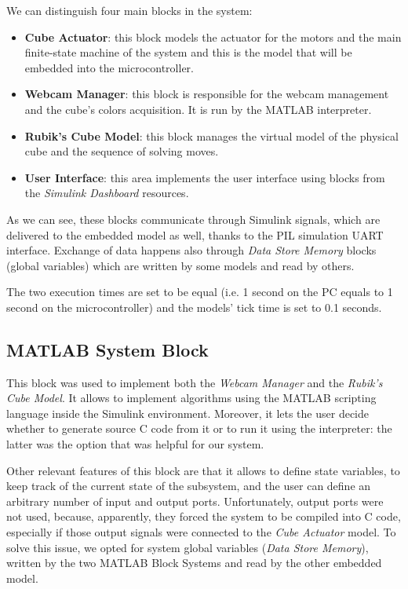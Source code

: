 \documentclass{report}
\begin{document}
We can distinguish four main blocks in the system:
\begin{itemize}
    \item \textbf{Cube Actuator}: this block models the actuator for the motors and the main finite-state machine of the system and this is the model that will be embedded into the microcontroller.
    \item \textbf{Webcam Manager}: this block is responsible for the webcam management and the cube's colors acquisition. It is run by the MATLAB interpreter.
    \item \textbf{Rubik's Cube Model}: this block manages the virtual model of the physical cube and the sequence of solving moves.
    \item \textbf{User Interface}: this area implements the user interface using blocks from the \textit{Simulink Dashboard} resources.
\end{itemize}

As we can see, these blocks communicate through Simulink signals, which are delivered to the embedded model as well, thanks to the PIL simulation UART interface. Exchange of data happens also through \textit{Data Store Memory} blocks (global variables) which are written by some models and read by others.

The two execution times are set to be equal (i.e. 1 second on the PC equals to 1 second on the microcontroller) and the models' tick time is set to 0.1 seconds.

\subsection{MATLAB System Block} 
This block was used to implement both the \textit{Webcam Manager} and the \textit{Rubik's Cube Model}. It allows to implement algorithms using the MATLAB scripting language inside the Simulink environment. Moreover, it lets the user decide whether to generate source C code from it or to run it using the interpreter: the latter was the option that was helpful for our system.

Other relevant features of this block are that it allows to define state variables, to keep track of the current state of the subsystem, and the user can define an arbitrary number of input and output ports. Unfortunately, output ports were not used, because, apparently, they forced the system to be compiled into C code, especially if those output signals were connected to the \textit{Cube Actuator} model. To solve this issue, we opted for system global variables (\textit{Data Store Memory}), written by the two MATLAB Block Systems and read by the other embedded model.
\end{document}
